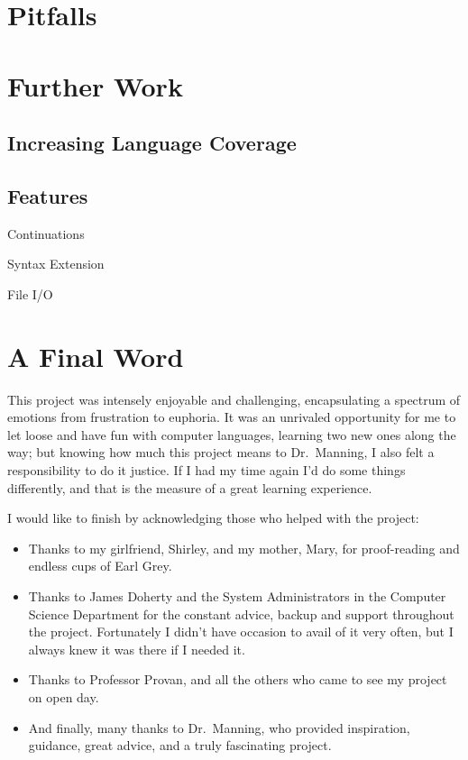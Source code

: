 \section{Pitfalls}


\section{Further Work}

\subsection{Increasing Language Coverage}

\subsection{Features}

Continuations

Syntax Extension

File I/O

\section{A Final Word}

This project was intensely enjoyable and challenging, encapsulating a spectrum
of emotions from frustration to euphoria. It was an unrivaled opportunity for me
to let loose and have fun with computer languages, learning two new ones along
the way; but knowing how much this project means to Dr.\ Manning, I also felt a
responsibility to do it justice. If I had my time again I'd do some things
differently, and that is the measure of a great learning experience.

I would like to finish by acknowledging those who helped with the project:
\begin{itemize}
\item Thanks to my girlfriend, Shirley, and my mother, Mary, for proof-reading
and endless cups of Earl Grey.
\item Thanks to James Doherty and the System Administrators in the Computer
Science Department for the constant advice, backup and support throughout the
project. Fortunately I didn't have occasion to avail of it very often, but I
always knew it was there if I needed it.
\item Thanks to Professor Provan, and all the others who came to see my project
on open day.
\item And finally, many thanks to Dr.\ Manning, who provided inspiration,
guidance, great advice, and a truly fascinating project.
\end{itemize}
